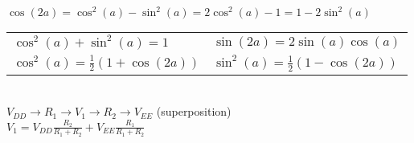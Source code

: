 \documentclass[12pt]{article}
\begin{document}
\begin{spacing}{0.8}
\begin{multicols*}{2}
\begin{flushleft}
\begin{outline}[longenum]
\\
$\cos(2a)=\cos^2(a) - \sin^2(a) = 2\cos^2(a)-1 = 1-2\sin^2(a)$
\\
\begin{tabular}{l|l}
$\cos^2(a)+\sin^2(a)=1$ & $\sin(2a) = 2\sin(a)\cos(a)$ \\
$\cos^2(a) = \frac{1}{2}(1 + \cos(2a))$ & $\sin^2(a) = \frac{1}{2}(1 - \cos(2a))$ \\
\end{tabular}

\\ $V_{DD} \rightarrow R_1 \rightarrow V_1 \rightarrow R_2 \rightarrow V_{EE}$
\hfill(superposition)
\\ $V_1=V_{DD}\frac{R_2}{R_1+R_2}+V_{EE}\frac{R_1}{R_1+R_2}$



\end{outline}
\end{flushleft}
\end{multicols*}
\end{spacing}
\end{document}

